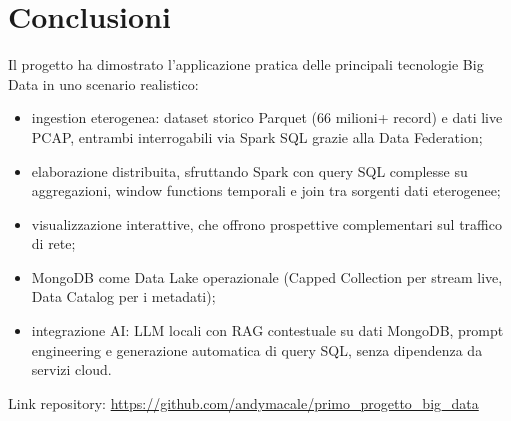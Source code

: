 \documentclass[10pt,a4paper]{article}
\begin{document}
    \section{Conclusioni}
    Il progetto ha dimostrato l’applicazione pratica delle principali tecnologie Big Data in uno scenario realistico:
    \begin{itemize}
        \item ingestion eterogenea: dataset storico Parquet (66 milioni+ record) e dati live PCAP, entrambi interrogabili via
                Spark SQL grazie alla Data Federation;
        \item elaborazione distribuita, sfruttando Spark con query SQL complesse su aggregazioni, window functions temporali e join tra sorgenti dati eterogenee;
        \item visualizzazione interattive, che offrono prospettive complementari sul traffico di rete;
        \item MongoDB come Data Lake operazionale (Capped Collection per stream live, Data
                Catalog per i metadati);
        \item integrazione AI: LLM locali con RAG contestuale su dati MongoDB, prompt engineering e generazione automatica di query SQL, senza dipendenza da servizi cloud.
    \end{itemize}
    Link repository: \url{https://github.com/andymacale/primo_progetto_big_data}
\end{document}
